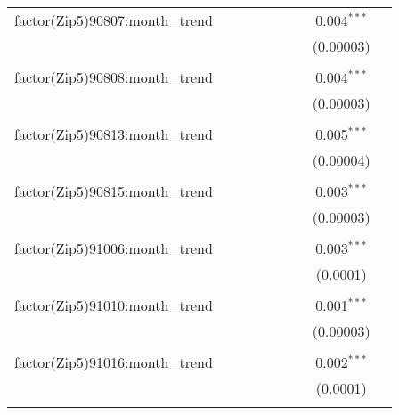 \begin{table}[H]
{\begin{tabular}{@{\extracolsep{5pt}}lcccccccc}
  factor(Zip5)90807:month\_trend &  &  &  &  &  &  & 0.004$^{***}$ &  \\  

   &  &  &  &  &  &  & (0.00003) &  \\  

   & & & & & & & & \\  

  factor(Zip5)90808:month\_trend &  &  &  &  &  &  & 0.004$^{***}$ &  \\  

   &  &  &  &  &  &  & (0.00003) &  \\  

   & & & & & & & & \\  

  factor(Zip5)90813:month\_trend &  &  &  &  &  &  & 0.005$^{***}$ &  \\  

   &  &  &  &  &  &  & (0.00004) &  \\  

   & & & & & & & & \\  

  factor(Zip5)90815:month\_trend &  &  &  &  &  &  & 0.003$^{***}$ &  \\  

   &  &  &  &  &  &  & (0.00003) &  \\  

   & & & & & & & & \\  

  factor(Zip5)91006:month\_trend &  &  &  &  &  &  & 0.003$^{***}$ &  \\  

   &  &  &  &  &  &  & (0.0001) &  \\  

   & & & & & & & & \\  

  factor(Zip5)91010:month\_trend &  &  &  &  &  &  & 0.001$^{***}$ &  \\  

   &  &  &  &  &  &  & (0.00003) &  \\  

   & & & & & & & & \\  

  factor(Zip5)91016:month\_trend &  &  &  &  &  &  & 0.002$^{***}$ &  \\  

   &  &  &  &  &  &  & (0.0001) &  \\  

   & & & & & & & & \\  


\end{tabular}}
\end{table}

